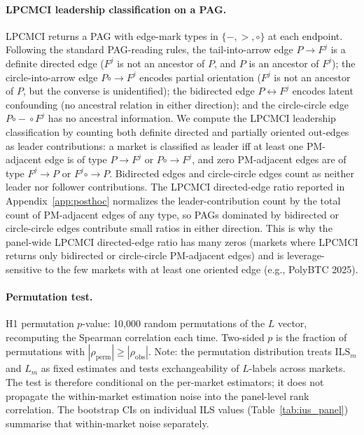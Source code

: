 \documentclass{article}
\begin{document}
\paragraph{LPCMCI leadership classification on a PAG.}
LPCMCI returns a PAG with edge-mark types in $\{{-}, {>}, \circ\}$ at each endpoint. Following the standard PAG-reading rules, the tail-into-arrow edge $P \xrightarrow{} F^j$ is a definite directed edge ($F^j$ is not an ancestor of $P$, and $P$ is an ancestor of $F^j$); the circle-into-arrow edge $P \mathbin{\circ\!{\to}} F^j$ encodes partial orientation ($F^j$ is not an ancestor of $P$, but the converse is unidentified); the bidirected edge $P \leftrightarrow F^j$ encodes latent confounding (no ancestral relation in either direction); and the circle-circle edge $P \mathbin{\circ\!{-}\!\circ} F^j$ has no ancestral information. We compute the LPCMCI leadership classification by counting both definite directed and partially oriented out-edges as leader contributions: a market is classified as leader iff at least one PM-adjacent edge is of type $P \xrightarrow{} F^j$ or $P \mathbin{\circ\!{\to}} F^j$, and zero PM-adjacent edges are of type $F^j \xrightarrow{} P$ or $F^j \mathbin{\circ\!{\to}} P$. Bidirected edges and circle-circle edges count as neither leader nor follower contributions. The LPCMCI directed-edge ratio reported in Appendix~\ref{app:posthoc} normalizes the leader-contribution count by the total count of PM-adjacent edges of any type, so PAGs dominated by bidirected or circle-circle edges contribute small ratios in either direction. This is why the panel-wide LPCMCI directed-edge ratio has many zeros (markets where LPCMCI returns only bidirected or circle-circle PM-adjacent edges) and is leverage-sensitive to the few markets with at least one oriented edge (e.g., PolyBTC 2025).

\paragraph{Permutation test.}
H1 permutation $p$-value: 10{,}000 random permutations of the $L$ vector, recomputing the Spearman correlation each time. Two-sided $p$ is the fraction of permutations with $|\rho_\text{perm}| \ge |\rho_\text{obs}|$. Note: the permutation distribution treats $\mathrm{ILS}_m$ and $L_m$ as fixed estimates and tests exchangeability of $L$-labels across markets. The test is therefore conditional on the per-market estimators; it does not propagate the within-market estimation noise into the panel-level rank correlation. The bootstrap CIs on individual ILS values (Table~\ref{tab:ius_panel}) summarise that within-market noise separately.
\end{document}
